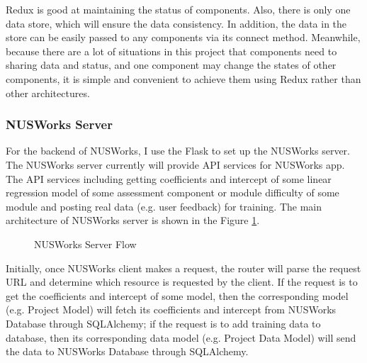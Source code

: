 \documentclass[fyp]{socreport}
\begin{document}
Redux is good at maintaining the status of components. Also, there is only one data store, which will ensure the data consistency. In addition, the data in the store can be easily passed to any components via its connect method. Meanwhile, because there are a lot of situations in this project that components need to sharing data and status, and one component may change the states of other components, it is simple and convenient to achieve them using Redux rather than other architectures.

\subsubsection{NUSWorks Server}
For the backend of NUSWorks, I use the Flask to set up the NUSWorks server. The NUSWorks server currently will provide API services for NUSWorks app. The API services including getting coefficients and intercept of some linear regression model of some assessment component or module difficulty of some module and posting real data (e.g. user feedback) for training. The main architecture of NUSWorks server is shown in the Figure {\ref{nusworks-server}}.

\begin{figure}
\caption{NUSWorks Server Flow}
\label{nusworks-server}
\end{figure}

Initially, once NUSWorks client makes a request, the router will parse the request URL and determine which resource is requested by the client. If the request is to get the coefficients and intercept of some model, then the corresponding model (e.g. Project Model) will fetch its coefficients and intercept from NUSWorks Database through SQLAlchemy; if the request is to add training data to database, then its corresponding data model (e.g. Project Data Model) will send the data to NUSWorks Database through SQLAlchemy.
\end{document}
